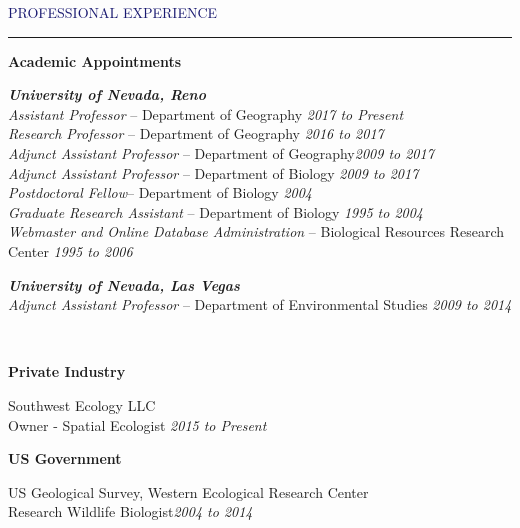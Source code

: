 \documentclass{resume} %
\renewenvironment{rSection}[1]{
\sectionskip
\textcolor{MidnightBlue}{\MakeUppercase{#1}}
\sectionlineskip
\hrule
\begin{list}{}{
\setlength{\leftmargin}{1.5em}
}
\item[]
}{
\end{list}
}
\begin{document}
\begin{rSection}{Professional Experience}
\begin{rSubSection}{\textbf{Academic Appointments}}\\
\begin{rSubSection}{\textbf{\textit{University of Nevada, Reno}}}\\
\textit{Assistant Professor} – Department of Geography \hfill {\em 2017 to Present}\\
\textit{Research Professor} – Department of Geography \hfill {\em 2016 to 2017}\\
\textit{Adjunct Assistant Professor} – Department of Geography\hfill {\em 2009 to 2017}\\
\textit{Adjunct Assistant Professor} – Department of Biology \hfill {\em 2009 to 2017}\\
\textit{Postdoctoral Fellow}– Department of Biology \hfill {\em 2004}\\
\textit{Graduate Research Assistant} – Department of Biology \hfill {\em 1995 to 2004}\\
\textit{Webmaster and Online Database Administration} – Biological Resources Research Center \hfill {\em 1995 to 2006}\\
\end{rSubSection}

\begin{rSubSection}{\textbf{\textit{University of Nevada, Las Vegas}}}\\
\textit{Adjunct Assistant Professor} – Department of Environmental Studies \hfill {\em 2009 to 2014}\\
\end{rSubSection}
\end{rSubSection}
\\
\begin{rSubSection}{\textbf{Private Industry}}\\
\begin{rSubSection}{Southwest Ecology LLC}\\
Owner - Spatial Ecologist \hfill{\em 2015 to Present}
\end{rSubSection}
\end{rSubSection}


\begin{rSubSection}{\textbf{US Government}}\\
\begin{rSubSection}{US Geological Survey, Western Ecological Research Center}\\
{Research Wildlife Biologist}\hfill {\em 2004 to 2014}\\
\end{rSubSection}
\end{rSubSection}


\end{rSection}
\end{document}
